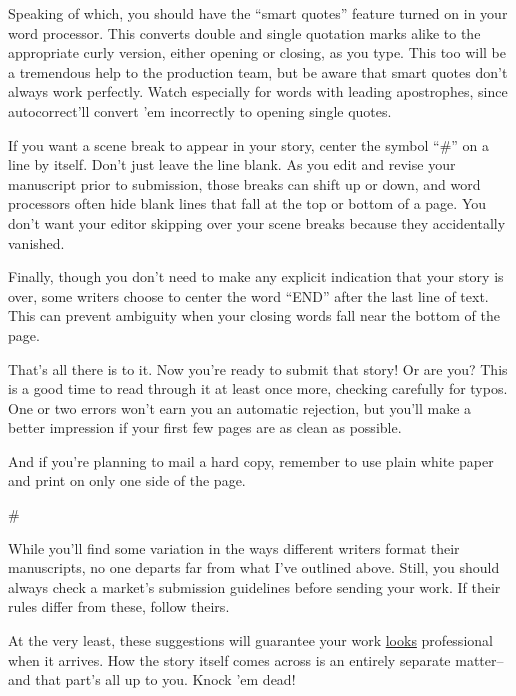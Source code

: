 \documentclass[12pt]{article}
\begin{document}
Speaking of which, you should have the “smart quotes”
feature turned on in your word processor. This converts double
and single quotation marks alike to the appropriate curly
version, either opening or closing, as you type. This too will
be a tremendous help to the production team, but be aware that
smart quotes don’t always work perfectly. Watch especially for
words with leading apostrophes, since autocorrect’ll convert ’em
incorrectly to opening single quotes.

If you want a scene break to appear in your story, center
the symbol “\#” on a line by itself. Don’t just leave the line
blank. As you edit and revise your manuscript prior to
submission, those breaks can shift up or down, and word
processors often hide blank lines that fall at the top or bottom
of a page. You don’t want your editor skipping over your scene
breaks because they accidentally vanished.

Finally, though you don’t need to make any explicit
indication that your story is over, some writers choose to center
the word “END” after the last line of text. This can prevent
ambiguity when your closing words fall near the bottom of the
page.

That’s all there is to it. Now you’re ready to submit that
story! Or are you? This is a good time to read through it at
least once more, checking carefully for typos. One or two errors
won’t earn you an automatic rejection, but you’ll make a better
impression if your first few pages are as clean as possible.

And if you’re planning to mail a hard copy, remember to use
plain white paper and print on only one side of the page.

\begin{center}
\#
\end{center}

While you’ll find some variation in the ways different
writers format their manuscripts, no one departs far from what
I’ve outlined above. Still, you should always check a market’s
submission guidelines before sending your work. If their rules
differ from these, follow theirs.

At the very least, these suggestions will guarantee your
work \underline{looks} professional when it arrives. How the story itself
comes across is an entirely separate matter--and that part’s all
up to you. Knock ’em dead!
\end{document}
